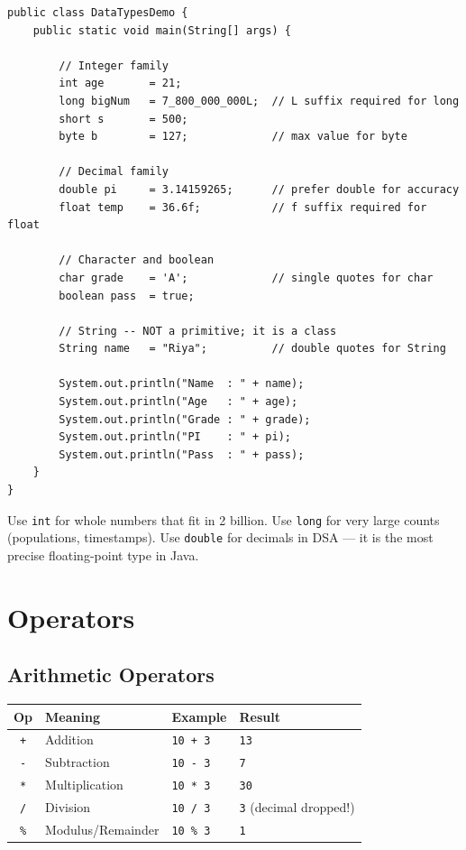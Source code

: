 \documentclass[12pt,a4paper,oneside]{book}
\begin{document}
\begin{lstlisting}[caption={Variables and Data Types in Action}]
public class DataTypesDemo {
    public static void main(String[] args) {

        // Integer family
        int age       = 21;
        long bigNum   = 7_800_000_000L;  // L suffix required for long
        short s       = 500;
        byte b        = 127;             // max value for byte

        // Decimal family
        double pi     = 3.14159265;      // prefer double for accuracy
        float temp    = 36.6f;           // f suffix required for float

        // Character and boolean
        char grade    = 'A';             // single quotes for char
        boolean pass  = true;

        // String -- NOT a primitive; it is a class
        String name   = "Riya";          // double quotes for String

        System.out.println("Name  : " + name);
        System.out.println("Age   : " + age);
        System.out.println("Grade : " + grade);
        System.out.println("PI    : " + pi);
        System.out.println("Pass  : " + pass);
    }
}
\end{lstlisting}

\begin{tipbox}
Use \texttt{int} for whole numbers that fit in 2 billion. Use \texttt{long} for very large counts (populations, timestamps). Use \texttt{double} for decimals in DSA --- it is the most precise floating-point type in Java.
\end{tipbox}

\section{Operators}

\subsection{Arithmetic Operators}

\begin{center}
\begin{tabular}{clll}
\toprule
\textbf{Op} & \textbf{Meaning} & \textbf{Example} & \textbf{Result}\\
\midrule
\texttt{+}  & Addition        & \texttt{10 + 3}  & \texttt{13}\\
\texttt{-}  & Subtraction     & \texttt{10 - 3}  & \texttt{7}\\
\texttt{*}  & Multiplication  & \texttt{10 * 3}  & \texttt{30}\\
\texttt{/}  & Division        & \texttt{10 / 3}  & \texttt{3} (decimal dropped!)\\
\texttt{\%} & Modulus/Remainder & \texttt{10 \% 3} & \texttt{1}\\
\bottomrule
\end{tabular}
\end{center}
\end{document}
